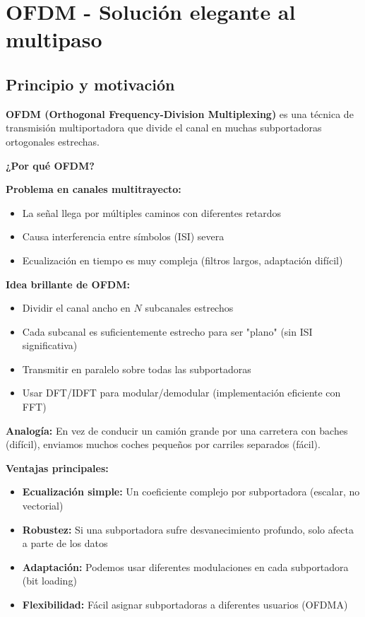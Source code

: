 \documentclass[10pt,a4paper]{article}
\begin{document}
\section{OFDM - Solución elegante al multipaso}

\subsection{Principio y motivación}

\textbf{OFDM (Orthogonal Frequency-Division Multiplexing)} es una técnica de transmisión multiportadora que divide el canal en muchas subportadoras ortogonales estrechas.

\textbf{¿Por qué OFDM?}

\textbf{Problema en canales multitrayecto:}
\begin{itemize}
\item La señal llega por múltiples caminos con diferentes retardos
\item Causa interferencia entre símbolos (ISI) severa
\item Ecualización en tiempo es muy compleja (filtros largos, adaptación difícil)
\end{itemize}

\textbf{Idea brillante de OFDM:}
\begin{itemize}
\item Dividir el canal ancho en $N$ subcanales estrechos
\item Cada subcanal es suficientemente estrecho para ser "plano" (sin ISI significativa)
\item Transmitir en paralelo sobre todas las subportadoras
\item Usar DFT/IDFT para modular/demodular (implementación eficiente con FFT)
\end{itemize}

\textbf{Analogía:} En vez de conducir un camión grande por una carretera con baches (difícil), enviamos muchos coches pequeños por carriles separados (fácil).

\textbf{Ventajas principales:}
\begin{itemize}
\item \textbf{Ecualización simple:} Un coeficiente complejo por subportadora (escalar, no vectorial)
\item \textbf{Robustez:} Si una subportadora sufre desvanecimiento profundo, solo afecta a parte de los datos
\item \textbf{Adaptación:} Podemos usar diferentes modulaciones en cada subportadora (bit loading)
\item \textbf{Flexibilidad:} Fácil asignar subportadoras a diferentes usuarios (OFDMA)
\end{itemize}
\end{document}
